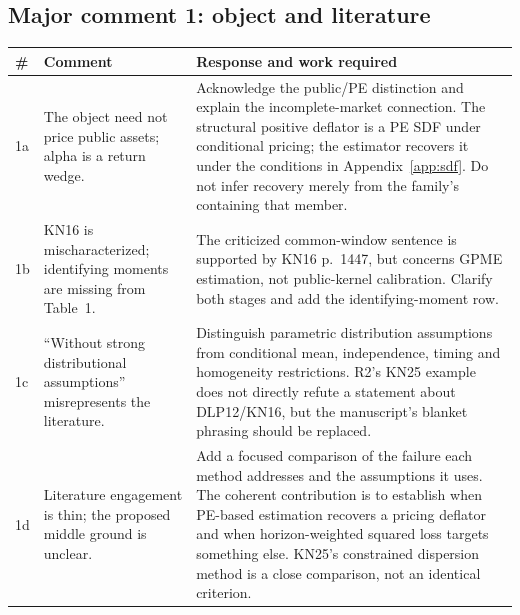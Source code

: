 \documentclass[11pt]{article}
\theoremstyle{plain}
\theoremstyle{definition}
\begin{document}
\subsection{Major comment 1: object and literature}
{\small
\begin{longtable}{@{}L{0.7cm}L{4.6cm}L{10.0cm}@{}}
\toprule
\# & Comment & Response and work required\\
\midrule
\endhead
1a & The object need not price public assets; alpha is a return wedge. & Acknowledge the public/PE distinction and explain the incomplete-market connection. The structural positive deflator is a PE SDF under conditional pricing; the estimator recovers it under the conditions in Appendix~\ref{app:sdf}. Do not infer recovery merely from the family's containing that member.\\
1b & KN16 is mischaracterized; identifying moments are missing from Table~1. & The criticized common-window sentence is supported by KN16 p.~1447, but concerns GPME estimation, not public-kernel calibration. Clarify both stages and add the identifying-moment row.\\
1c & ``Without strong distributional assumptions'' misrepresents the literature. & Distinguish parametric distribution assumptions from conditional mean, independence, timing and homogeneity restrictions. R2's KN25 example does not directly refute a statement about DLP12/KN16, but the manuscript's blanket phrasing should be replaced.\\
1d & Literature engagement is thin; the proposed middle ground is unclear. & Add a focused comparison of the failure each method addresses and the assumptions it uses. The coherent contribution is to establish when PE-based estimation recovers a pricing deflator and when horizon-weighted squared loss targets something else. KN25's constrained dispersion method is a close comparison, not an identical criterion.\\
\bottomrule
\end{longtable}
}
\end{document}
